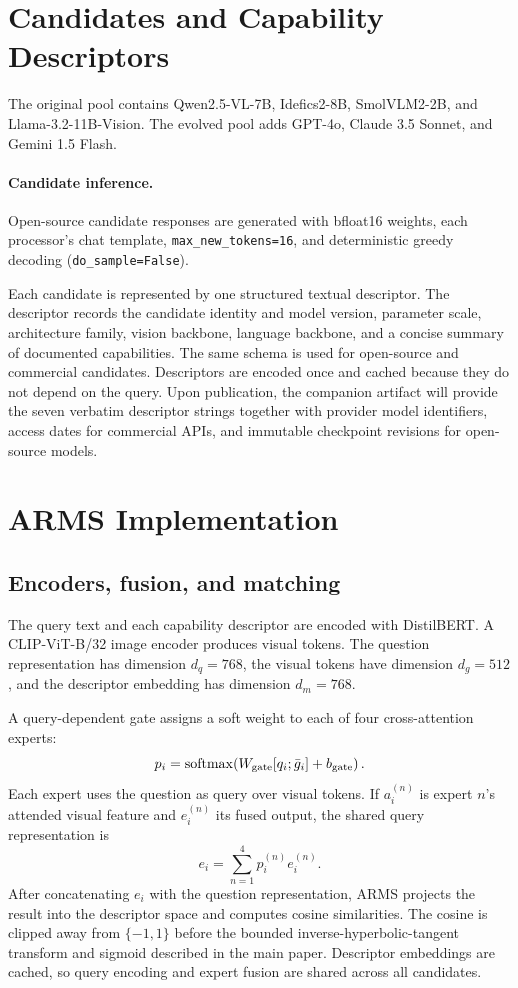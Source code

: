\documentclass[letterpaper]{article}
\begin{document}
\section{Candidates and Capability Descriptors}

The original pool contains Qwen2.5-VL-7B, Idefics2-8B, SmolVLM2-2B, and
Llama-3.2-11B-Vision. The evolved pool adds GPT-4o, Claude 3.5 Sonnet, and
Gemini 1.5 Flash.

\paragraph{Candidate inference.}
Open-source candidate responses are generated with bfloat16 weights, each
processor's chat template,
\texttt{max\_new\_tokens=16}, and deterministic greedy decoding
(\texttt{do\_sample=False}).

Each candidate is represented by one structured textual descriptor. The
descriptor records the candidate identity and model version, parameter scale,
architecture family, vision backbone, language backbone, and a concise
summary of documented capabilities. The same schema is used for open-source and
commercial candidates. Descriptors are encoded once and cached because they do
not depend on the query. Upon publication, the companion artifact will provide
the seven verbatim descriptor strings together with provider model identifiers,
access dates for commercial APIs, and immutable checkpoint revisions for
open-source models.

\section{ARMS Implementation}

\subsection{Encoders, fusion, and matching}

The query text and each capability descriptor are encoded with DistilBERT. A
CLIP-ViT-B/32 image encoder produces visual tokens. The question representation
has dimension $d_q=768$, the visual tokens have dimension $d_g=512$, and the
descriptor embedding has dimension $d_m=768$.

A query-dependent gate assigns a soft weight to each of four cross-attention
experts:
\begin{equation}
p_i=\operatorname{softmax}\!\left(
W_{\rm gate}[q_i;\bar g_i]+b_{\rm gate}\right).
\end{equation}
Each expert uses the question as query over visual tokens. If
$a_i^{(n)}$ is expert $n$'s attended visual feature and $e_i^{(n)}$ its fused
output, the shared query representation is
\begin{equation}
e_i=\sum_{n=1}^{4}p_i^{(n)}e_i^{(n)}.
\end{equation}
After concatenating $e_i$ with the question representation, ARMS projects the
result into the descriptor space and computes cosine
similarities. The cosine is clipped away from $\{-1,1\}$ before the bounded
inverse-hyperbolic-tangent transform and sigmoid described in the main paper.
Descriptor embeddings are cached, so query encoding and expert fusion are
shared across all candidates.
\end{document}
